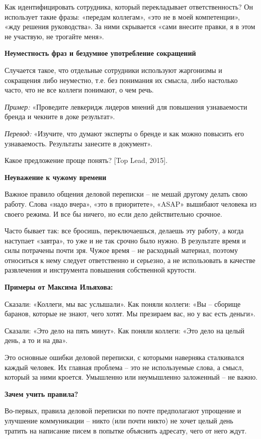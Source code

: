 Как идентифицировать сотрудника, который перекладывает ответственность? Он использует такие фразы: «передам коллегам», «это не в моей компетенции», «жду решения руководства». За ними скрывается «сами внесите правки, я в этом не участвую, не трогайте меня».

\textbf{Неуместность фраз и бездумное употребление сокращений}

Случается такое, что отдельные сотрудники используют жаргонизмы и сокращения либо неуместно, т.е. без понимания их смысла, либо настолько часто, что не все коллеги понимают, о чем речь.

\textit{Пример:} «Проведите левкеридж лидеров мнений для повышения узнаваемости бренда и чекните в доке результат».

\textit{Перевод:} «Изучите, что думают эксперты о бренде и как можно повысить его узнаваемость. Результаты занесите в документ».

Какое предложение проще понять? [Top Lead, 2015].

\textbf{Неуважение к чужому времени}

Важное правило общения деловой переписки – не мешай другому делать свою работу. Слова «надо вчера», «это в приоритете», «ASAP» вышибают человека из своего режима. И все бы ничего, но если дело действительно срочное.

Часто бывает так: все бросишь, переключаешься, делаешь эту работу, а когда наступает «завтра», то уже и не так срочно было нужно. В результате время и силы потрачены почти зря. Чужое время – не расходный материал, поэтому относиться к нему следует ответственно и серьезно, а не использовать в качестве развлечения и инструмента повышения собственной крутости.

\textbf{Примеры от Максима Ильяхова:}

Сказали: «Коллеги, мы вас услышали». Как поняли коллеги: «Вы – сборище баранов, которые не знают, чего хотят. Мы презираем вас, но у вас есть деньги».

Сказали: «Это дело на пять минут». Как поняли коллеги: «Это дело на целый день, а то и на два».

Это основные ошибки деловой переписки, с которыми наверняка сталкивался каждый человек. Их главная проблема – это не используемые слова, а смысл, который за ними кроется. Умышленно или неумышленно заложенный – не важно.

\textbf{Зачем учить правила?}

Во-первых, правила деловой переписки по почте предполагают упрощение и улучшение коммуникации – никто (или почти никто) не хочет целый день тратить на написание писем в попытке объяснить адресату, чего от него ждут.

